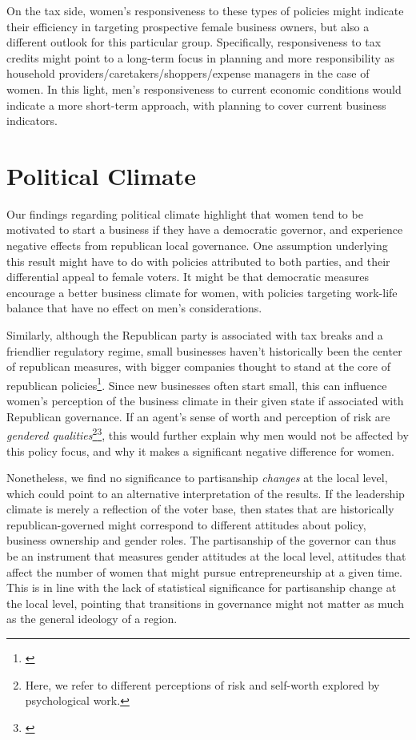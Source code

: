 On the tax side, women's responsiveness to these types of policies might indicate their efficiency in targeting prospective female business owners, but also a different outlook for this particular group. Specifically, responsiveness to tax credits might point to a long-term focus in planning and more responsibility as household providers/caretakers/shoppers/expense managers in the case of women. In this light, men's responsiveness to current economic conditions would indicate a more short-term approach, with planning to cover current business indicators. 

\section{Political Climate}
Our findings regarding political climate highlight that women tend to be motivated to start a business if they have a democratic governor, and experience negative effects from republican local governance. One assumption underlying this result might have to do with policies attributed to both parties, and their differential appeal to female voters. It might be that democratic measures encourage a better business climate for women, with policies targeting work-life balance that have no effect on men's considerations. 

Similarly, although the Republican party is associated with tax breaks and a friendlier regulatory regime, small businesses haven't historically been the center of republican measures, with bigger companies thought to stand at the core of republican policies\footnote{\cite{Brown2010}}. Since new businesses often start small, this can influence women's perception of the business climate in their given state if associated with Republican governance. If an agent's sense of worth and perception of risk are \textit{gendered qualities}\footnote{Here, we refer to different perceptions of risk and self-worth explored by psychological work.}\footnote{\cite{adams2012beyond}}, this would further explain why men would not be affected by this policy focus, and why it makes a significant negative difference for women.

Nonetheless, we find no significance to partisanship \textit{changes} at the local level, which could point to an alternative interpretation of the results. If the leadership climate is merely a reflection of the voter base, then states that are historically republican-governed might correspond to different attitudes about policy, business ownership and gender roles. The partisanship of the governor can thus be an instrument that measures gender attitudes at the local level, attitudes that affect the number of women that might pursue entrepreneurship at a given time. This is in line with the lack of statistical significance for partisanship change at the local level, pointing that transitions in governance might not matter as much as the general ideology of a region.


